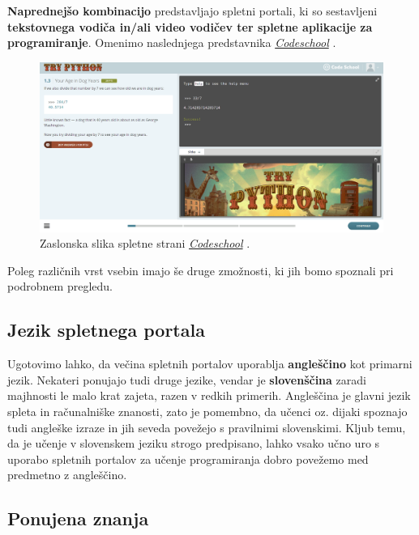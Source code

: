 \textbf{Naprednejšo kombinacijo} predstavljajo spletni portali, ki so
sestavljeni \textbf{tekstovnega vodiča in/ali video vodičev ter
  spletne aplikacije za programiranje}. Omenimo naslednjega
predstavnika \emph{\href{https://www.codeschool.com/}{Codeschool}}
\cite{web:codeschool}.

\begin{figure}[h!]
    \includegraphics [width=1\linewidth, keepaspectratio =
    1] {./images/sc_web/codeschool_01.png}
    \caption{Zaslonska slika spletne strani
      \emph{\href{https://www.codeschool.com/}{Codeschool}}
      \cite{web:codeschool}.}
    \label{fig:scr:web:codeschool}
\end{figure}

Poleg različnih vrst vsebin imajo še druge zmožnosti, ki jih bomo
spoznali pri podrobnem pregledu.

\subsection{Jezik spletnega portala}
\label{sec:jezik_spletnega_portala}

Ugotovimo lahko, da večina spletnih portalov uporablja
\textbf{angleščino} kot primarni jezik. Nekateri ponujajo tudi druge
jezike, vendar je \textbf{slovenščina} zaradi majhnosti le malo krat
zajeta, razen v redkih primerih. Angleščina je glavni jezik spleta in
računalniške znanosti, zato je pomembno, da učenci oz. dijaki spoznajo
tudi angleške izraze in jih seveda povežejo s pravilnimi
slovenskimi. Kljub temu, da je učenje v slovenskem jeziku strogo
predpisano, lahko vsako učno uro s uporabo spletnih portalov za učenje
programiranja dobro povežemo med predmetno z angleščino.


\subsection{Ponujena znanja}
\label{sec:vsebina_problemsk_pristop}


